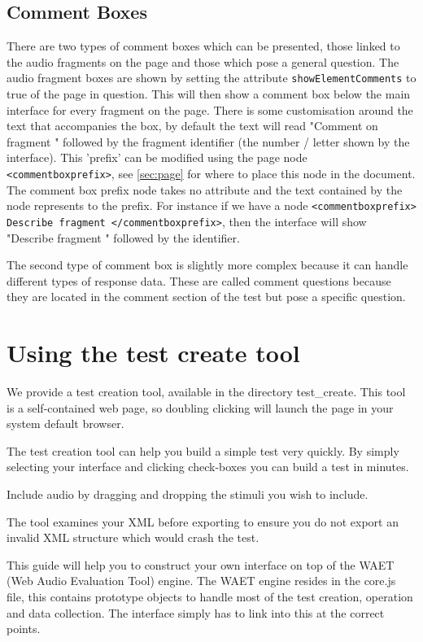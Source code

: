 \documentclass[11pt, oneside]{article}   	%
\begin{document}
	\subsection{Comment Boxes}
	\label{sec:commentboxes}
	    There are two types of comment boxes which can be presented, those linked to the audio fragments on the page and those which pose a general question. The audio fragment boxes are shown by setting the attribute \texttt{showElementComments} to true of the page in question. This will then show a comment box below the main interface for every fragment on the page. There is some customisation around the text that accompanies the box, by default the text will read "Comment on fragment " followed by the fragment identifier (the number / letter shown by the interface). This 'prefix' can be modified using the page node \texttt{<commentboxprefix>}, see \ref{sec:page} for where to place this node in the document. The comment box prefix node takes no attribute and the text contained by the node represents to the prefix. For instance if we have a node \texttt{<commentboxprefix> Describe fragment </commentboxprefix>}, then the interface will show "Describe fragment " followed by the identifier.
	    
	    The second type of comment box is slightly more complex because it can handle different types of response data. These are called comment questions because they are located in the comment section of the test but pose a specific question.

\clearpage


\section{Using the test create tool}
	We provide a test creation tool, available in the directory test\_create. This tool is a self-contained web page, so doubling clicking will launch the page in your system default browser.

	The test creation tool can help you build a simple test very quickly. By simply selecting your interface and clicking check-boxes you can build a test in minutes.

	Include audio by dragging and dropping the stimuli you wish to include. 

	The tool examines your XML before exporting to ensure you do not export an invalid XML structure which would crash the test.
	
	This guide will help you to construct your own interface on top of the WAET (Web Audio Evaluation Tool) engine. The WAET engine resides in the core.js file, this contains prototype objects to handle most of the test creation, operation and data collection. The interface simply has to link into this at the correct points.
	
\end{document}
